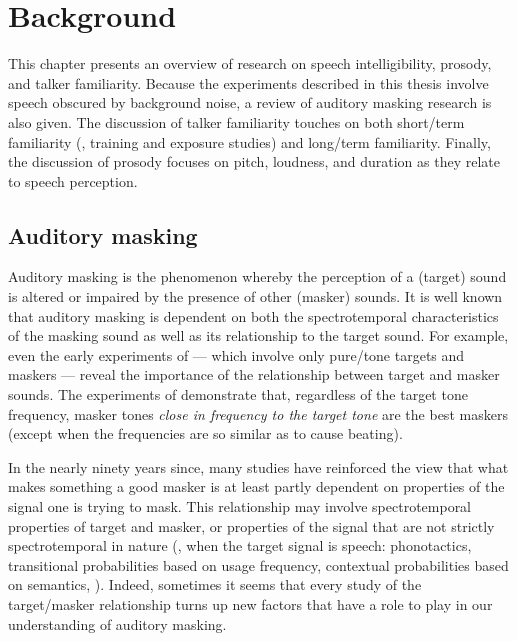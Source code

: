 \chapter{Background\label{chap:Background}}
This chapter presents an overview of research on speech intelligibility, prosody, and talker familiarity.  Because the experiments described in this thesis involve speech obscured by background noise, a review of auditory masking research is also given.  The discussion of talker familiarity touches on both short\-/term familiarity (\ie, training and exposure studies) and long\-/term familiarity.  Finally, the discussion of prosody focuses on pitch, loudness, and duration as they relate to speech perception.

\section{Auditory masking}
Auditory masking is the phenomenon whereby the perception of a (target) sound is altered or impaired by the presence of other (masker) sounds.  It is well known that auditory masking is dependent on both the spectrotemporal characteristics of the masking sound as well as its relationship to the target sound.  %
For example, even the early experiments of \citet{WegelLane1924} — which involve only pure\-/tone targets and maskers — reveal the importance of the relationship between target and masker sounds.  The experiments of \citeauthor*{WegelLane1924} demonstrate that, regardless of the target tone frequency, masker tones \emph{close in frequency to the target tone} are the best maskers (except when the frequencies are so similar as to cause beating).  

In the nearly ninety years since, many studies have reinforced the view that what makes something a good masker is at least partly dependent on properties of the signal one is trying to mask.  This relationship may involve spectrotemporal properties of target and masker, or properties of the signal that are not strictly spectrotemporal in nature (\eg, when the target signal is speech: phonotactics, transitional probabilities based on usage frequency, contextual probabilities based on semantics, \etc).  Indeed, sometimes it seems that every study of the target\-/masker relationship turns up new factors that have a role to play in our understanding of auditory masking.

